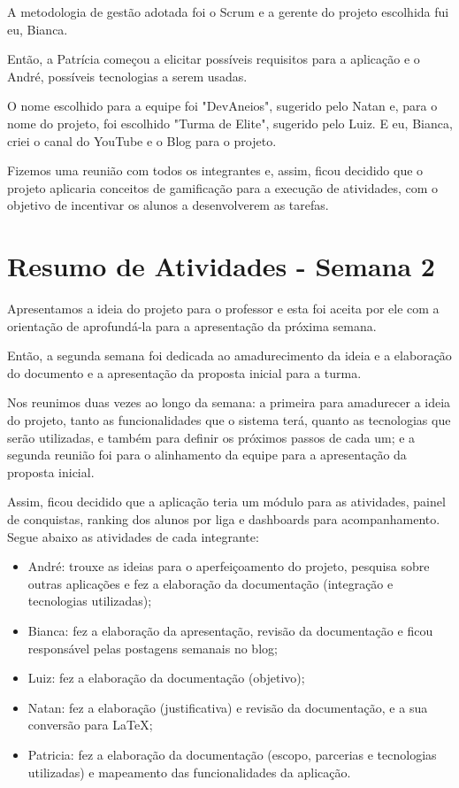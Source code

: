 \begin{apendicesenv}
A metodologia de gestão adotada foi o Scrum e a gerente do projeto escolhida fui eu, Bianca.

Então, a Patrícia começou a elicitar possíveis requisitos para a aplicação e o André, possíveis tecnologias a serem usadas.

O nome escolhido para a equipe foi "DevAneios", sugerido pelo Natan e, para o nome do projeto, foi escolhido "Turma de Elite", sugerido pelo Luiz. E eu, Bianca, criei o canal do YouTube e o Blog para o projeto.

Fizemos uma reunião com todos os integrantes e, assim, ficou decidido que o projeto aplicaria conceitos de gamificação para a execução de atividades, com o objetivo de incentivar os alunos a desenvolverem as tarefas.


\section{Resumo de Atividades - Semana 2}
Apresentamos a ideia do projeto para o professor e esta foi aceita por ele com a orientação de aprofundá-la para a apresentação da próxima semana. 

Então, a segunda semana foi dedicada ao amadurecimento da ideia e a elaboração do documento e a apresentação da proposta inicial para a turma. 

Nos reunimos duas vezes ao longo da semana: a primeira para amadurecer a ideia do projeto, tanto as funcionalidades que o sistema terá, quanto as tecnologias que serão utilizadas, e também para definir os próximos passos de cada um; e a segunda reunião foi para o alinhamento da equipe para a apresentação da proposta inicial.

Assim, ficou decidido que a aplicação teria um módulo para as atividades, painel de conquistas, ranking dos alunos por liga e \glspl{dashboard} para acompanhamento.
Segue abaixo as atividades de cada integrante:

\begin{itemize}
\item André: trouxe as ideias para o aperfeiçoamento do projeto, pesquisa sobre outras aplicações e fez a elaboração da documentação (integração e tecnologias utilizadas);
\item Bianca: fez a elaboração da apresentação, revisão da documentação e ficou responsável pelas postagens semanais no blog;
\item Luiz: fez a elaboração da documentação (objetivo);
\item Natan: fez a elaboração (justificativa) e revisão da documentação, e a sua conversão para LaTeX;
\item Patricia: fez a elaboração da documentação (escopo, parcerias e tecnologias utilizadas) e mapeamento das funcionalidades da aplicação.
\end{itemize}


\end{apendicesenv}
